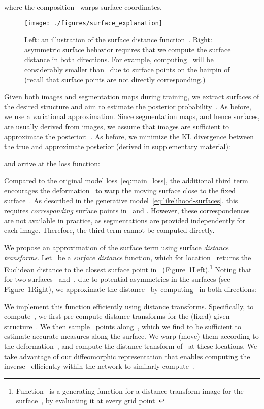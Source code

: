 \documentclass{article}
\begin{document}
where the composition~ warps surface coordinates. 


\begin{figure}[t!]
	\centering
	\texttt{[image: ./figures/surface\_explanation]}
	\hfill
	\vspace{-0.75cm}
	\caption{\color{blue} Left: an illustration of the surface distance function~. Right: asymmetric surface behavior requires that we compute the surface distance in both directions. For example, computing~ will be considerably smaller than~ due to surface points on the hairpin of  (recall that surface points are not directly corresponding.)}
	\label{fig:surface_explanation}
\end{figure}



Given both images and segmentation maps during training, we extract surfaces of the desired structure and aim to estimate the posterior probability~. As before, we use a variational approximation. Since segmentation maps, and hence surfaces, are usually derived from images, we assume that images are sufficient to approximate the posterior:~\mbox{}. As before, we minimize the KL divergence between the true and approximate posterior (derived in supplementary material):

and arrive at the loss function:

Compared to the original model loss~\eqref{eq:main_loss}, the additional third term encourages the deformation~ to warp the moving surface close to the fixed surface~. As described in the generative model~\eqref{eq:likelihood-surfaces}, this requires \textit{corresponding} surface points in~ and . However, these correspondences are not available in practice, as segmentations are provided independently for each image. Therefore, the third term cannot be computed directly.


We propose an approximation of the surface term using surface \textit{distance transforms}. Let~ be a \textit{surface distance} function, which for location~ returns the Euclidean distance to the closest surface point in~ (Figure~\ref{fig:surface_explanation}Left).\footnote{Function~ is a generating function for a distance transform image for the surface~, by evaluating it at every grid point~} Noting that for two surfaces~ and~,  due to potential asymmetries in the surfaces (see Figure~\ref{fig:surface_explanation}Right), we approximate the distance~ by computing~ in both directions: 

{\color{blue} We implement this function efficiently using distance transforms. Specifically, to compute~\mbox{}, we first pre-compute distance transforms for the (fixed) given structure~. We then sample~ points along~, which we find to be sufficient to estimate accurate measures along the surface. We warp (move) them according to the deformation~, and compute the distance transform of~ at these locations. We take advantage of our diffeomorphic representation that enables computing the inverse~ efficiently within the network to similarly compute~\mbox{}.}
\end{document}
